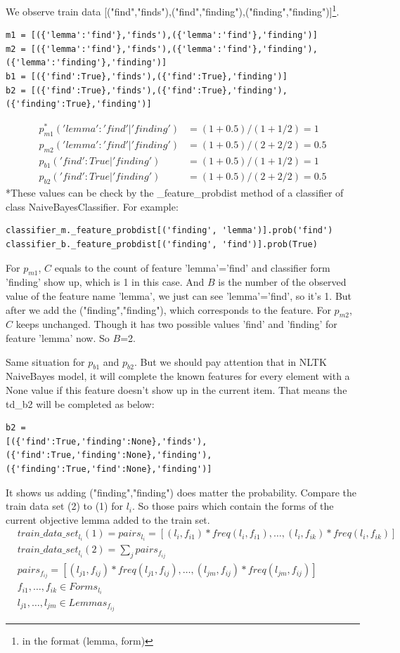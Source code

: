 \documentclass[a4paper]{article}
\begin{document}
We observe train data [("find","finds"),("find","finding"),("finding","finding")]\footnote{in the format (lemma, form)}. 
\begin{lstlisting}
m1 = [({'lemma':'find'},'finds'),({'lemma':'find'},'finding')]
m2 = [({'lemma':'find'},'finds'),({'lemma':'find'},'finding'),({'lemma':'finding'},'finding')]
b1 = [({'find':True},'finds'),({'find':True},'finding')]
b2 = [({'find':True},'finds'),({'find':True},'finding'),({'finding':True},'finding')]
\end{lstlisting}
\begin{align*}
p_{m1}^*('lemma':'find'|'finding')&=(1+0.5)/(1+1/2)=1 \\
p_{m2}('lemma':'find'|'finding')&=(1+0.5)/(2+2/2)=0.5 \\
p_{b1}('find':True|'finding')&=(1+0.5)/(1+1/2)=1 \\
p_{b2}('find':True|'finding')&=(1+0.5)/(2+2/2)=0.5
\end{align*}
*These values can be check by the \_feature\_probdist method of a classifier of class NaiveBayesClassifier. For example:
\begin{lstlisting}
classifier_m._feature_probdist[('finding', 'lemma')].prob('find')
classifier_b._feature_probdist[('finding', 'find')].prob(True)
\end{lstlisting}

For $p_{m1}$, $C$ equals to the count of feature 'lemma'='find' and classifier form 'finding' show up, which is 1 in this case. And $B$ is the number of the observed value of the feature name 'lemma', we just can see 'lemma'='find', so it's 1.
But after we add the ("finding","finding"), which corresponds to the feature. For $p_{m2}$, $C$ keeps unchanged. Though it has two possible values 'find' and 'finding' for feature 'lemma' now. So $B$=2.

Same situation for $p_{b1}$ and $p_{b2}$. But we should pay attention that in NLTK NaiveBayes model, it will complete the known features for every element with a None value if this feature doesn't show up in the current item. That means the td\_b2 will be completed as below:
\begin{lstlisting}
b2 =
[({'find':True,'finding':None},'finds'),
({'find':True,'finding':None},'finding'),
({'finding':True,'find':None},'finding')]
\end{lstlisting}

It shows us adding ("finding","finding") does matter the probability. Compare the train data set (2) to (1) for $l_i$. So those pairs which contain the forms of the current objective lemma added to the train set.
\begin{align*}
&train\_data\_set_{l_i} (1) = pairs_{l_{i}} = [ (l_{i},f_{i1})*freq(l_{i},f_{i1}),\dots,(l_{i},f_{ik})*freq(l_{i},f_{ik})] \\
&train\_data\_set_{l_i} (2)= \sum_{j} pairs_{f_{ij}} \\
&pairs_{f_{ij}}=[ (l_{j1},f_{ij})*freq(l_{j1},f_{ij}),\dots,(l_{jm},f_{ij})*freq(l_{jm},f_{ij}) ] \\ 
&f_{i1},\dots,f_{ik} \in Forms_{l_i} \\
&l_{j1},\dots,l_{jm} \in Lemmas_{f_{ij}} 
\end{align*}
\end{document}

